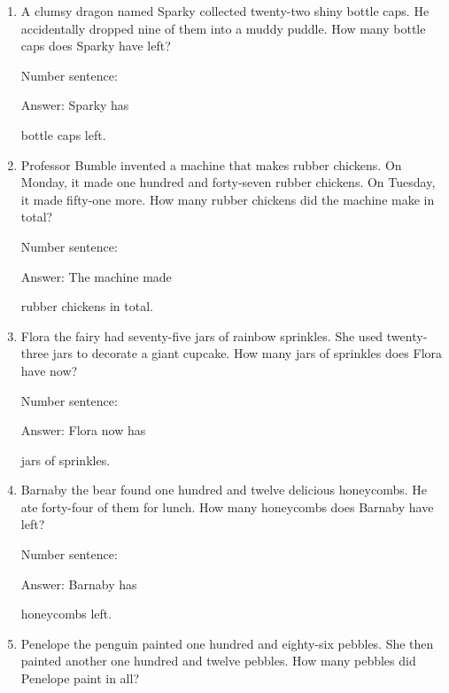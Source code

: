 \documentclass{tufte-book}
\begin{document}
\begin{enumerate}

\item
  A clumsy dragon named Sparky collected twenty-two shiny bottle caps.
  He accidentally dropped nine of them into a muddy puddle. How many
  bottle caps does Sparky have left?\medskip\par
  Number sentence:
  \dotfill\medskip\par
  Answer: Sparky has
  \dotfill\medskip\par\mbox{}\dotfill\medskip\par\mbox{}\dotfill\bigskip
  bottle caps left.
\item
  Professor Bumble invented a machine that makes rubber chickens. On
  Monday, it made one hundred and forty-seven rubber chickens. On
  Tuesday, it made fifty-one more. How many rubber chickens did the
  machine make in total?\medskip\par
  Number sentence:
  \dotfill\medskip\par
  Answer: The machine made
  \dotfill\medskip\par\mbox{}\dotfill\medskip\par\mbox{}\dotfill\bigskip
  rubber chickens in total.
\item
  Flora the fairy had seventy-five jars of rainbow sprinkles. She used
  twenty-three jars to decorate a giant cupcake. How many jars of
  sprinkles does Flora have now?\medskip\par
  Number sentence:
  \dotfill\medskip\par
  Answer: Flora now has
  \dotfill\medskip\par\mbox{}\dotfill\medskip\par\mbox{}\dotfill\bigskip
  jars of sprinkles.
\item
  Barnaby the bear found one hundred and twelve delicious honeycombs. He
  ate forty-four of them for lunch. How many honeycombs does Barnaby
  have left?\medskip\par
  Number sentence:
  \dotfill\medskip\par
  Answer: Barnaby has
  \dotfill\medskip\par\mbox{}\dotfill\medskip\par\mbox{}\dotfill\bigskip
  honeycombs left.
\item
  Penelope the penguin painted one hundred and eighty-six pebbles. She
  then painted another one hundred and twelve pebbles. How many pebbles
  did Penelope paint in all?\medskip\par

\end{enumerate}
\end{document}

